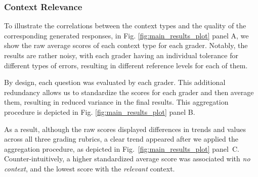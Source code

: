\documentclass{article}
\begin{document}
\subsubsection{Context Relevance}

    To illustrate the correlations between the context types and the quality of the corresponding generated responses, in Fig. \ref{fig:main_results_plot} panel A, we show the raw average scores of each context type for each grader. Notably, the results are rather noisy, with each grader having an individual tolerance for different types of errors, resulting in different reference levels for each of them.

    By design, each question was evaluated by each grader. This additional redundancy allows us to standardize the scores for each grader and then average them, resulting in reduced variance in the final results. This aggregation procedure is depicted in Fig. \ref{fig:main_results_plot} panel B.
    
    

    As a result, although the raw scores displayed differences in trends and values across all three grading rubrics, a clear trend appeared after we applied the aggregation procedure, as depicted in Fig.~\ref{fig:main_results_plot} panel~C. Counter-intuitively, a higher standardized average score was associated with \emph{no context}, and the lowest score with the \emph{relevant} context.
    
\end{document}

